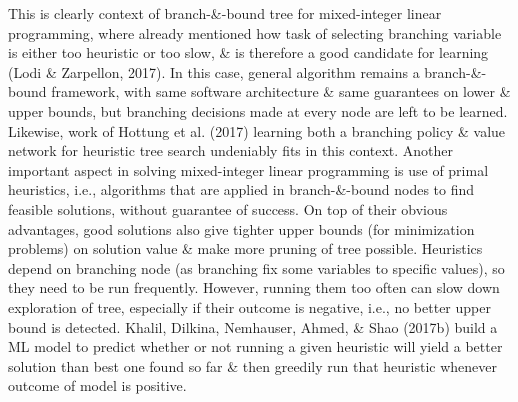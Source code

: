 \documentclass{article}
\begin{document}
\begin{itemize}
\begin{itemize}
\begin{itemize}
            This is clearly context of branch-\&-bound tree for mixed-integer linear programming, where already mentioned how task of selecting branching variable is either too heuristic or too slow, \& is therefore a good candidate for learning (Lodi \& Zarpellon, 2017). In this case, general algorithm remains a branch-\&-bound framework, with same software architecture \& same guarantees on lower \& upper bounds, but branching decisions made at every node are left to be learned. Likewise, work of Hottung et al. (2017) learning both a branching policy \& value network for heuristic tree search undeniably fits in this context. Another important aspect in solving mixed-integer linear programming is use of primal heuristics, i.e., algorithms that are applied in branch-\&-bound nodes to find feasible solutions, without guarantee of success. On top of their obvious advantages, good solutions also give tighter upper bounds (for minimization problems) on solution value \& make more pruning of tree possible. Heuristics depend on branching node (as branching fix some variables to specific values), so they need to be run frequently. However, running them too often can slow down exploration of tree, especially if their outcome is negative, i.e., no better upper bound is detected. Khalil, Dilkina, Nemhauser, Ahmed, \& Shao (2017b) build a ML model to predict whether or not running a given heuristic will yield a better solution than best one found so far \& then greedily run that heuristic whenever outcome of model is positive.


\end{itemize}
\end{itemize}
\end{itemize}
\end{document}
